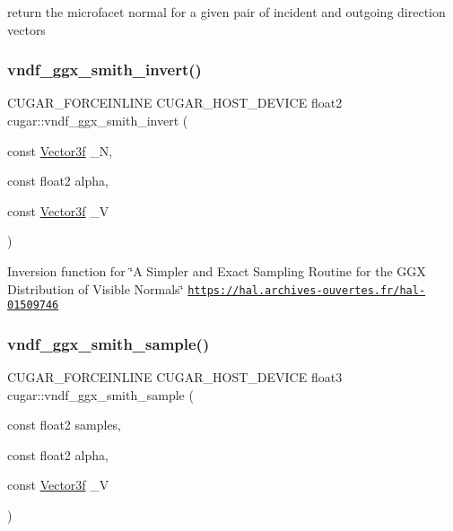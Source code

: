 return the microfacet normal for a given pair of incident and outgoing direction vectors \mbox{\label{group___b_s_d_f_module_gabe2116f566e70937f1abb126140afae8}} 
\subsubsection{\texorpdfstring{vndf\+\_\+ggx\+\_\+smith\+\_\+invert()}{vndf\_ggx\_smith\_invert()}}
{\footnotesize\ttfamily C\+U\+G\+A\+R\+\_\+\+F\+O\+R\+C\+E\+I\+N\+L\+I\+NE C\+U\+G\+A\+R\+\_\+\+H\+O\+S\+T\+\_\+\+D\+E\+V\+I\+CE float2 cugar\+::vndf\+\_\+ggx\+\_\+smith\+\_\+invert (\begin{DoxyParamCaption}\item[{const \hyperlink{structcugar_1_1_vector}{Vector3f}}]{\+\_\+N,  }\item[{const float2}]{alpha,  }\item[{const \hyperlink{structcugar_1_1_vector}{Vector3f}}]{\+\_\+V }\end{DoxyParamCaption})}

Inversion function for \char`\"{}\+A Simpler and Exact Sampling Routine for the G\+G\+X Distribution of Visible Normals\char`\"{} \href{https://hal.archives-ouvertes.fr/hal-01509746}{\tt https\+://hal.\+archives-\/ouvertes.\+fr/hal-\/01509746} \mbox{\label{group___b_s_d_f_module_gaae32e76bc82f281f61485ea552aba53a}} 
\subsubsection{\texorpdfstring{vndf\+\_\+ggx\+\_\+smith\+\_\+sample()}{vndf\_ggx\_smith\_sample()}}
{\footnotesize\ttfamily C\+U\+G\+A\+R\+\_\+\+F\+O\+R\+C\+E\+I\+N\+L\+I\+NE C\+U\+G\+A\+R\+\_\+\+H\+O\+S\+T\+\_\+\+D\+E\+V\+I\+CE float3 cugar\+::vndf\+\_\+ggx\+\_\+smith\+\_\+sample (\begin{DoxyParamCaption}\item[{const float2}]{samples,  }\item[{const float2}]{alpha,  }\item[{const \hyperlink{structcugar_1_1_vector}{Vector3f}}]{\+\_\+V }\end{DoxyParamCaption})}

